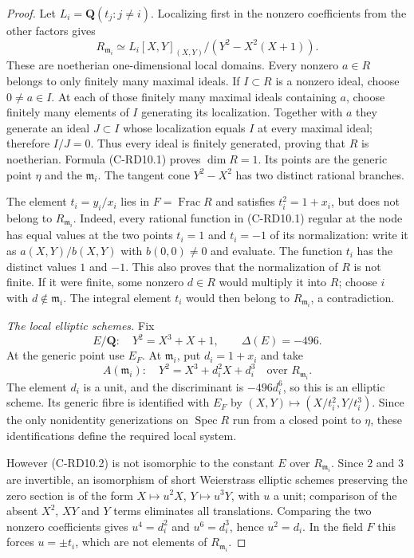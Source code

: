 \begin{proof}
Let $L_i=\mathbf Q(t_j:j\ne i)$. Localizing first in the nonzero
coefficients from the other factors gives
\[
 R_{\mathfrak m_i}
   \simeq L_i[X,Y]_{(X,Y)}/(Y^2-X^2(X+1)).                 \tag{C-RD10.1}
\]
These are noetherian one-dimensional local domains. Every nonzero
$a\in R$ belongs to only finitely many maximal ideals. If $I\subset R$
is a nonzero ideal, choose $0\ne a\in I$. At each of those finitely
many maximal ideals containing $a$, choose finitely many elements of
$I$ generating its localization. Together with $a$ they generate an
ideal $J\subset I$ whose localization equals $I$ at every maximal
ideal; therefore $I/J=0$. Thus every ideal is finitely generated,
proving that $R$ is noetherian. Formula (C-RD10.1) proves $\dim R=1$.
Its points are the generic point $\eta$ and the $\mathfrak m_i$.
The tangent cone $Y^2-X^2$ has two distinct rational branches.

The element $t_i=y_i/x_i$ lies in $F=\operatorname{Frac}R$ and satisfies
$t_i^2=1+x_i$, but does not belong to $R_{\mathfrak m_i}$. Indeed,
every rational function in (C-RD10.1) regular at the node has equal
values at the two points $t_i=1$ and $t_i=-1$ of its normalization:
write it as $a(X,Y)/b(X,Y)$ with $b(0,0)\ne0$ and evaluate. The
function $t_i$ has the distinct values $1$ and $-1$.
This also proves that the normalization of $R$ is not finite. If it
were finite, some nonzero $d\in R$ would multiply it into $R$; choose
$i$ with $d\notin\mathfrak m_i$. The integral element $t_i$ would
then belong to $R_{\mathfrak m_i}$, a contradiction.

\emph{The local elliptic schemes.} Fix
\[
 E/\mathbf Q:\quad Y^2=X^3+X+1,
 \qquad \Delta(E)=-496.
\]
At the generic point use $E_F$. At $\mathfrak m_i$, put $d_i=1+x_i$
and take
\[
 A(\mathfrak m_i):\quad
 Y^2=X^3+d_i^2X+d_i^3
 \quad\text{over }R_{\mathfrak m_i}.                    \tag{C-RD10.2}
\]
The element $d_i$ is a unit, and the discriminant is $-496d_i^6$,
so this is an elliptic scheme. Its generic fibre is identified with
$E_F$ by $(X,Y)\mapsto(X/t_i^2,Y/t_i^3)$. Since the only nonidentity
generizations on $\operatorname{Spec}R$ run from a closed point to
$\eta$, these identifications define the required local system.

However (C-RD10.2) is not isomorphic to the constant $E$ over
$R_{\mathfrak m_i}$. Since $2$ and $3$ are invertible, an isomorphism
of short Weierstrass elliptic schemes preserving the zero section is
of the form $X\mapsto u^2X$, $Y\mapsto u^3Y$, with $u$ a unit;
comparison of the absent $X^2$, $XY$ and $Y$ terms eliminates all
translations. Comparing the two nonzero coefficients gives
$u^4=d_i^2$ and $u^6=d_i^3$, hence $u^2=d_i$. In the field $F$ this
forces $u=\pm t_i$, which are not elements of $R_{\mathfrak m_i}$.


\end{proof}
